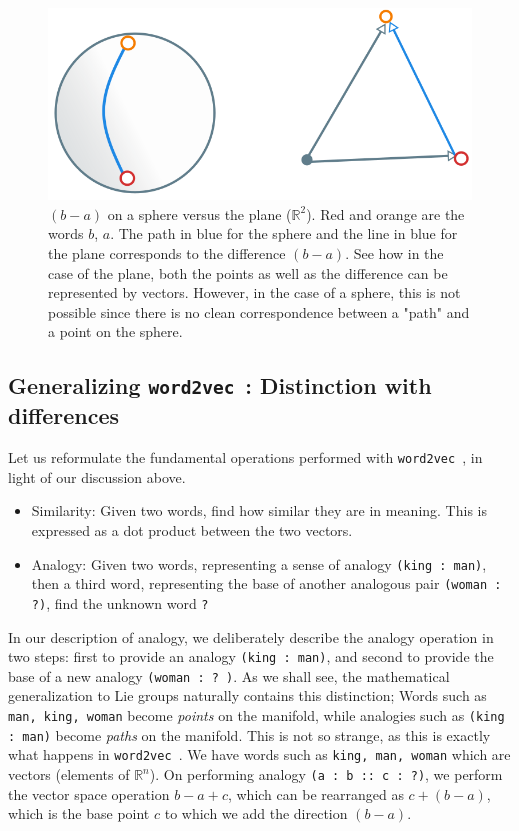 \documentclass[11pt]{book}
\newcommand{\wtov}{\texttt{word2vec }}
\newcommand{\R}{\ensuremath{\mathbb R}}
\begin{document}
\begin{figure}[H]
\includegraphics[width=\textwidth]{./sphere-shortest-path.png}
\caption{$(b - a)$ on a sphere versus the plane ($\R^2$). Red and
  orange are the words $b$, $a$. The path in blue for the sphere and the
  line in blue for the plane corresponds to the difference $(b - a)$. See
  how in the case of the plane, both the points as well as the difference can
  be represented by vectors. However, in the case of a sphere, this is
  not possible since there is no clean correspondence between a "path" and
  a point on the sphere.}
\end{figure}


\subsection{Generalizing \wtov: Distinction with differences}

Let us reformulate the fundamental operations performed with \wtov, in light
of our discussion above.

\begin{itemize}
\item Similarity: Given two words, find how similar they are in meaning. This is
     expressed as a dot product between the two vectors.
\item Analogy: Given two words, representing a sense of analogy \texttt{(king : man)},
      then a third word, representing the base of another analogous
      pair \texttt{(woman : ?)}, find the unknown word \texttt{?}
\end{itemize}


In our description of analogy, we deliberately describe the analogy operation
in two steps: first to provide an analogy \texttt{(king : man)}, and second
to provide the base of a new analogy \texttt{(woman : ? )}. As we shall see,
the mathematical generalization to Lie groups naturally contains this distinction;
Words such as \texttt{man, king, woman} become \emph{points} on the manifold,
while analogies such as \texttt{(king : man)} become \emph{paths} on the manifold.
This is not so strange, as this is exactly what happens in \wtov. We have
words such as \texttt{king, man, woman} which are vectors (elements of $\R^n$). 
On performing analogy \texttt{(a : b :: c : ?)}, we perform the vector
space operation $b - a + c$, which can be rearranged as $c + (b - a)$, which
is the base point $c$ to which we add the direction $(b - a)$.
\end{document}
